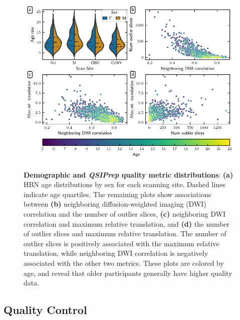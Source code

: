 \documentclass[9pt,lineno]{elife}
\begin{document}
\begin{figure}[tbp]
    {\label{fig:metric-dist:age}}
    {\label{fig:metric-dist:ndc-slices}}
    {\label{fig:metric-dist:ndc-translation}}
    {\label{fig:metric-dist:slices-translation}}
    \centering
    \includegraphics[width=\linewidth]{bundle-profiles/qsiprep-metric-distributions.pdf}
    \caption{%
        {\bf Demographic and \emph{QSIPrep} quality metric distributions}:
        \textbf{(a)} HBN age distributions by sex for each scanning site. Dashed lines
        indicate age quartiles.
        The remaining plots show associations between \textbf{(b)} neighboring
        diffusion-weighted imaging (DWI) correlation  \citep{yeh2019-kb} and the
        number of outlier slices, \textbf{(c)} neighboring DWI correlation and maximum relative
        translation, and \textbf{(d)} the number of outlier slices and maximum
        relative translation.
        The number of outlier slices is positively associated with the maximum
        relative translation, while neighboring DWI correlation is negatively associated with the other
        two metrics.
        These plots are colored by age, and reveal that older participants
        generally have higher quality data.
    }
    \label{fig:metric-dist}
\end{figure}

\subsection{Quality Control}
\end{document}
